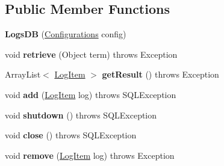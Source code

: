 \subsection*{Public Member Functions}
\begin{DoxyCompactItemize}
\item 
\hypertarget{classw3se_1_1_model_1_1_database_1_1_logs_d_b_a68e9b2e999e684993ba422fbeb9b8acc}{{\bfseries Logs\-D\-B} (\hyperlink{classw3se_1_1_model_1_1_configurations}{Configurations} config)}\label{classw3se_1_1_model_1_1_database_1_1_logs_d_b_a68e9b2e999e684993ba422fbeb9b8acc}

\item 
\hypertarget{classw3se_1_1_model_1_1_database_1_1_logs_d_b_a2462cdb18b901e2e05fcf08b67536ca1}{void {\bfseries retrieve} (Object term)  throws Exception 	}\label{classw3se_1_1_model_1_1_database_1_1_logs_d_b_a2462cdb18b901e2e05fcf08b67536ca1}

\item 
\hypertarget{classw3se_1_1_model_1_1_database_1_1_logs_d_b_a3c2d0c70259b0040ce636ae1ac7da81c}{Array\-List$<$ \hyperlink{classw3se_1_1_model_1_1_base_1_1_log_item}{Log\-Item} $>$ {\bfseries get\-Result} ()  throws Exception 	}\label{classw3se_1_1_model_1_1_database_1_1_logs_d_b_a3c2d0c70259b0040ce636ae1ac7da81c}

\item 
\hypertarget{classw3se_1_1_model_1_1_database_1_1_logs_d_b_a2fe88637bd2b73773eb2dd5b3c3ff45a}{void {\bfseries add} (\hyperlink{classw3se_1_1_model_1_1_base_1_1_log_item}{Log\-Item} log)  throws S\-Q\-L\-Exception 	}\label{classw3se_1_1_model_1_1_database_1_1_logs_d_b_a2fe88637bd2b73773eb2dd5b3c3ff45a}

\item 
\hypertarget{classw3se_1_1_model_1_1_database_1_1_logs_d_b_aa6945394d0e7d6fc65f4dcf61c4975b4}{void {\bfseries shutdown} ()  throws S\-Q\-L\-Exception 	}\label{classw3se_1_1_model_1_1_database_1_1_logs_d_b_aa6945394d0e7d6fc65f4dcf61c4975b4}

\item 
\hypertarget{classw3se_1_1_model_1_1_database_1_1_logs_d_b_a60ede130c81e631c2850e6d940be5c0d}{void {\bfseries close} ()  throws S\-Q\-L\-Exception 	}\label{classw3se_1_1_model_1_1_database_1_1_logs_d_b_a60ede130c81e631c2850e6d940be5c0d}

\item 
\hypertarget{classw3se_1_1_model_1_1_database_1_1_logs_d_b_aca3d8a31821823b239d67e2cbc839242}{void {\bfseries remove} (\hyperlink{classw3se_1_1_model_1_1_base_1_1_log_item}{Log\-Item} log)  throws Exception 	}\label{classw3se_1_1_model_1_1_database_1_1_logs_d_b_aca3d8a31821823b239d67e2cbc839242}

\end{DoxyCompactItemize}

